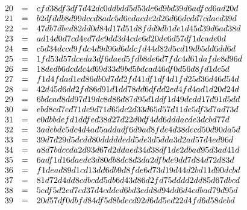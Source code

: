 \begin{multicols}{2}
\[\begin{array}{rcl}
\end{array}\\
\begin{array}{rcl}
20 &=& cfd38df3df7d42dc0ddbdd5d53de6d9bd39d6adfcd6ad20d \\
21 &=& b2dfddb8d99dccd8adc5d6edacde2d26d66dcdd7cdaed39d \\
22 &=& 47db7dbed82dd0d84d17d51d8fdd9db1de1d45d39d6ad38d \\
23 &=& ad14d0d7cd4ed7de9dd3d4cde6d20de6d57df1dcade0d \\
24 &=& c5d34dccd9fdc4d9d96d6ddcfd44d82d5cd19db5dd6dd6d \\
25 &=& 1fd53d57dceda3df6daed5fdb8de6d7fdc4d61dafde8d96d \\
26 &=& 18dedb6dcddc4d69d33d9bd5bdcad46df0d56d8fd1dc5d \\
27 &=& f1d4fdad1ed86db0d7dd2fd41df1df4d1fd25d36d46d54d \\
28 &=& 42d45d6dd2fd86d91d1dd78dd6dfdd2ed4fd4ad1d20d24d \\
29 &=& 6bdcad8dd97d19dc8d86d87d95d1ddf1d49dedd17d91d5dd \\
30 &=& ebd8cd7ed71de9d71d65dc2d33d65d57d11de5df3d7ad73d \\
31 &=& e0dbbdefd1ddfed38d27d22d0df4dd6dddacde3dcbd77d \\
32 &=& 3adebdc5dc4d4ad5addadf6d9ad8fde4d38decd50d90da5d \\
33 &=& 39d7d29d5dcdd80dddddedd5de3d5dda3d2ad57d4ed96d \\
34 &=& a8d7bdccda2d93d67d2ddaed34d38df1de2dbad95d3ad41d \\
35 &=& 6adf1d16daedc3d80db8dc8d3da2dfbde9dd7d84d72d83d \\
36 &=& f1dead89d1cd13dd6db9d8fde6d73d19d44d2bd11d90dcbd \\
37 &=& 81d72d4dd8cdbcdd5db6d43d86d2fd75dddd2dd85d67dbcd \\
38 &=& 5edf5d2ed7cd37d4cdded6bd3edd8d94dd6d4cdbad79d95d \\
39 &=& 20d57df0dbfd84df5d8bdecd92d6dd5ed22d4fd6d58debd \\
\end{array}\\
\]\end{multicols}
